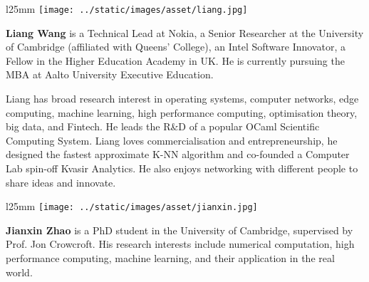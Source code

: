 \begin{wrapfigure}{l}{25mm} 
    \texttt{[image: ../static/images/asset/liang.jpg]}
\end{wrapfigure}\par
\textbf{Liang Wang} is a Technical Lead at Nokia, a Senior Researcher at the University of Cambridge (affiliated with Queens' College), an Intel Software Innovator, a Fellow in the Higher Education Academy in UK. He is currently pursuing the MBA at Aalto University Executive Education. 

Liang has broad research interest in operating systems, computer networks, edge computing, machine learning, high performance computing, optimisation theory, big data, and Fintech. He leads the R\&D of a popular OCaml Scientific Computing System. Liang loves commercialisation and entrepreneurship, he designed the fastest approximate K-NN algorithm and co-founded a Computer Lab spin-off Kvasir Analytics. He also enjoys networking with different people to share ideas and innovate.\par

\vspace{3cm}

\begin{wrapfigure}{l}{25mm} 
    \vspace{-4mm}
    \texttt{[image: ../static/images/asset/jianxin.jpg]}
\end{wrapfigure}\par
\textbf{Jianxin Zhao} is a PhD student in the University of Cambridge, supervised by Prof. Jon Crowcroft. His research interests include numerical computation, high performance computing, machine learning, and their application in the real world.\par


\clearpage